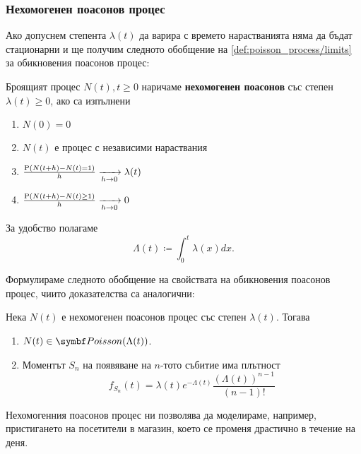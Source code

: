 \documentclass{../../common/topic}
\begin{document}
\subsubsection{Нехомогенен поасонов процес}

Ако допуснем степента \( \lambda(t) \) да варира с времето нарастванията няма да бъдат стационарни и ще получим следното обобщение на \cref{def:poisson_process/limits} за обикновения поасонов процес:
\begin{definition}
  Броящият процес \( N(t), t \geq 0 \) наричаме \textbf{нехомогенен поасонов} със степен \( \lambda(t) \geq 0 \), ако са изпълнени
  \begin{enumerate}
    \item \( N(0) = 0 \)
    \item \( N(t) \) е процес с независими нараствания
    \item \( \frac {\operatorname{P}(N(t+h) - N(t) = 1)} h \xrightarrow[h \to 0]{} \lambda(t) \)
    \item \( \frac {\operatorname{P}(N(t+h) - N(t) \geq 1)} h \xrightarrow[h \to 0]{} 0 \)
  \end{enumerate}

  За удобство полагаме
  \begin{equation*}
    \Lambda(t) \coloneqq \int_0^t \lambda(x) dx.
  \end{equation*}
\end{definition}

Формулираме следното обобщение на свойствата на обикновения поасонов процес, чиито доказателства са аналогични:
\begin{theorem}
  Нека \( N(t) \) е нехомогенен поасонов процес със степен \( \lambda(t) \). Тогава
  \begin{enumerate}
    \item \( N(t) \in \distr{Poisson}(\Lambda(t)) \).
    \item Моментът \( S_n \) на появяване на \( n \)-тото събитие има плътност
    \begin{equation*}
      f_{S_n}(t) = \lambda(t) e^{-\Lambda(t)} \frac {{(\Lambda(t))}^{n-1}} {(n-1)!}
    \end{equation*}
  \end{enumerate}
\end{theorem}

\begin{remark}
  Нехомогенния поасонов процес ни позволява да моделираме, например, пристигането на посетители в магазин, което се променя драстично в течение на деня.
\end{remark}

\printbibliography
\end{document}
